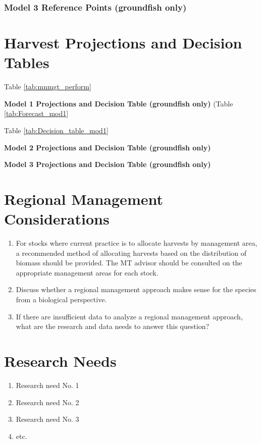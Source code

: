 \documentclass[12pt,]{article}
\providecommand{\tightlist}{%
  \setlength{\itemsep}{0pt}\setlength{\parskip}{0pt}}
\begin{document}
\subsubsection{Model 3 Reference Points (groundfish
only)}\label{model-3-reference-points-groundfish-only}

\section{Harvest Projections and Decision
Tables}\label{harvest-projections-and-decision-tables}

Table \ref{tab:mnmgt_perform}

\textbf{Model 1 Projections and Decision Table (groundfish only)} (Table
\ref{tab:Forecast_mod1}

Table \ref{tab:Decision_table_mod1}

\textbf{Model 2 Projections and Decision Table (groundfish only)}

\textbf{Model 3 Projections and Decision Table (groundfish only)}

\section{Regional Management
Considerations}\label{regional-management-considerations}

\begin{enumerate}
\def\labelenumi{\arabic{enumi}.}
\tightlist
\item
  For stocks where current practice is to allocate harvests by
  management area, a recommended method of allocating harvests based on
  the distribution of biomass should be provided. The MT advisor should
  be consulted on the appropriate management areas for each stock.
\item
  Discuss whether a regional management approach makes sense for the
  species from a biological perspective.
\item
  If there are insufficient data to analyze a regional management
  approach, what are the research and data needs to answer this
  question?
\end{enumerate}

\section{Research Needs}\label{research-needs}

\begin{enumerate}

\item Research need No. 1

\item Research need No. 2

\item Research need No. 3

\item etc.

\end{enumerate}
\end{document}
